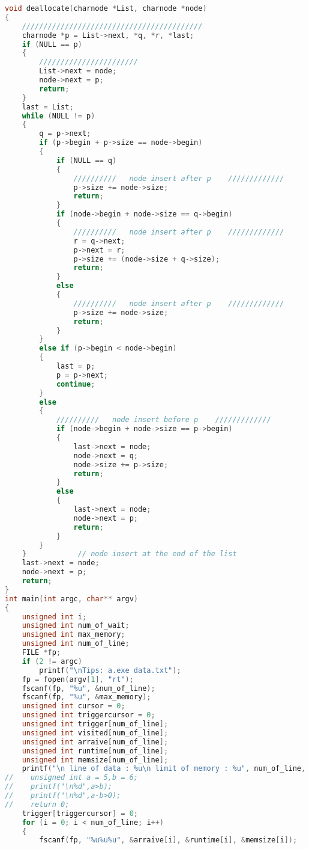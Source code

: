 \documentclass[UTF8]{ctexart}
\begin{document}
\begin{lstlisting}[language = C]
void deallocate(charnode *List, charnode *node)
{
    //////////////////////////////////////////
    charnode *p = List->next, *q, *r, *last;
    if (NULL == p)
    {
        ///////////////////////
        List->next = node;
        node->next = p;
        return;
    }
    last = List;
    while (NULL != p)
    {
        q = p->next;
        if (p->begin + p->size == node->begin)
        {
            if (NULL == q)
            {
                //////////   node insert after p    /////////////
                p->size += node->size;
                return;
            }
            if (node->begin + node->size == q->begin)
            {
                //////////   node insert after p    /////////////
                r = q->next;
                p->next = r;
                p->size += (node->size + q->size);
                return;
            }
            else
            {
                //////////   node insert after p    /////////////
                p->size += node->size;
                return;
            }
        }
        else if (p->begin < node->begin)
        {
            last = p;
            p = p->next;
            continue;
        }
        else
        {
            //////////   node insert before p    /////////////
            if (node->begin + node->size == p->begin)
            {
                last->next = node;
                node->next = q;
                node->size += p->size;
                return;
            }
            else
            {
                last->next = node;
                node->next = p;
                return;
            }
        }
    }            // node insert at the end of the list
    last->next = node;
    node->next = p;
    return;
}
int main(int argc, char** argv)
{
    unsigned int i;
    unsigned int num_of_wait;
    unsigned int max_memory;
    unsigned int num_of_line;
    FILE *fp;
    if (2 != argc)
        printf("\nTips: a.exe data.txt");
    fp = fopen(argv[1], "rt");
    fscanf(fp, "%u", &num_of_line);
    fscanf(fp, "%u", &max_memory);
    unsigned int cursor = 0;
    unsigned int triggercursor = 0;
    unsigned int trigger[num_of_line];
    unsigned int visited[num_of_line];
    unsigned int arraive[num_of_line];
    unsigned int runtime[num_of_line];
    unsigned int memsize[num_of_line];
    printf("\n line of data : %u\n limit of memory : %u", num_of_line, max_memory);
//    unsigned int a = 5,b = 6;
//    printf("\n%d",a>b);
//    printf("\n%d",a-b>0);
//    return 0;
    trigger[triggercursor] = 0;
    for (i = 0; i < num_of_line; i++)
    {
        fscanf(fp, "%u%u%u", &arraive[i], &runtime[i], &memsize[i]);

\end{lstlisting}
\end{document}
